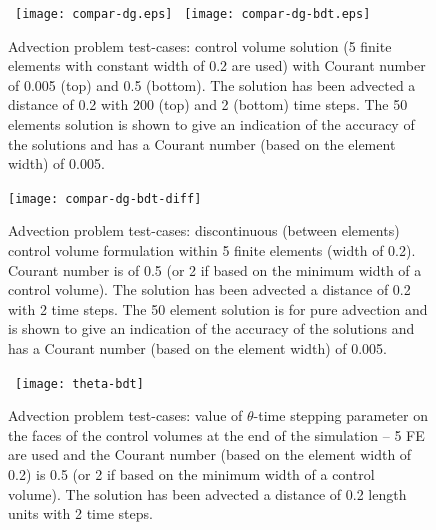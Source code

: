 \begin{figure}[h]
 
  \begin{center}
\vbox{\hbox{\hspace{1cm}
    \texttt{[image: compar-dg.eps]}}
   \hbox{ \hspace{1cm} \texttt{[image: compar-dg-bdt.eps]}}}
    \caption{Advection problem test-cases: control volume solution (5
      finite elements with constant width of 0.2 are used) with
      Courant number of 0.005 (top) and 0.5 (bottom).  The solution
      has been advected a distance of 0.2 with 200 (top) and 2
      (bottom) time steps. The 50 elements solution is shown to give
      an indication of the accuracy of the solutions and has a Courant
      number (based on the element width) of 0.005.\label{compar-dg}}
  \end{center}
\end{figure}

\begin{figure}[h]
\begin{center}
\texttt{[image: compar-dg-bdt-diff]}
\end{center}
\caption{Advection problem test-cases: discontinuous (between
  elements) control volume formulation within 5 finite elements (width
  of 0.2). Courant number is of 0.5 (or 2 if based on the minimum
  width of a control volume). The solution has been advected a
  distance of 0.2 with 2 time steps. The 50 element solution is for
  pure advection and is shown to give an indication of the accuracy of
  the solutions and has a Courant number (based on the element width)
  of 0.005.\label{compar-dg-bdt-diff}}
\end{figure}


\begin{figure}[h]
\vbox{\hbox{\hspace{-1.3cm}
\texttt{[image: theta-bdt]}}
\vspace{0.cm}}
\caption{Advection problem test-cases: value of $\theta$-time stepping
  parameter on the faces of the control volumes at the end of the
  simulation -- 5 FE are used and the Courant number (based on the
  element width of 0.2) is 0.5 (or 2 if based on the minimum width of
  a control volume). The solution has been advected a distance of 0.2
  length units with 2 time steps.}
\label{theta-bdt}
\end{figure}


